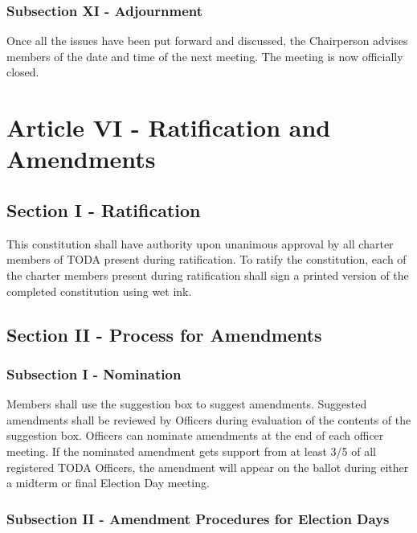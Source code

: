 \documentclass[11pt]{article}
\begin{document}
\subsubsection{Subsection XI - Adjournment}
\label{sec:orga43ed4c}

Once all the issues have been put forward and discussed, 
the Chairperson advises members of the date and time of the next meeting. 
The meeting is now officially closed.

\section{Article VI - Ratification and Amendments}
\label{sec:org4bee17d}

\subsection{Section I - Ratification}
\label{sec:org0f91a2e}

This constitution shall have authority upon unanimous approval by all charter members of TODA present during ratification. 
To ratify the constitution, each of the charter members present during ratification shall sign a printed version of the completed constitution using wet ink.

\subsection{Section II - Process for Amendments}
\label{sec:org2142dcb}

\subsubsection{Subsection I - Nomination}
\label{sec:org0ac950d}

Members shall use the suggestion box to suggest amendments. 
Suggested amendments shall be reviewed by Officers during evaluation of the contents of the suggestion box.
Officers can nominate amendments at the end of each officer meeting. 
If the nominated amendment gets support from at least 3/5 of all registered TODA Officers, the amendment will appear on the ballot during either a midterm or final Election Day meeting.

\subsubsection{Subsection II - Amendment Procedures for Election Days}
\label{sec:orgedd7684}
\end{document}
